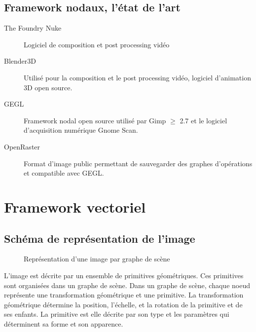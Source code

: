 		\subsection{Framework nodaux, l'état de l'art}
			\begin{description}
				\item[The Foundry Nuke]Logiciel de composition et post processing vidéo
				\item[Blender3D]Utilisé pour la composition et le post processing vidéo, logiciel d'animation 3D open source.
				\item[GEGL]Framework nodal open source utilisé par Gimp $\geq$ 2.7 et le logiciel d'acquisition numérique Gnome Scan.
				\item[OpenRaster]Format d'image public permettant de sauvegarder des graphes d'opérations et compatible avec GEGL.
			\end{description}

	\section{Framework vectoriel}
		\subsection{Schéma de représentation de l'image}
			\begin{figure}[h]
				\centering
				\caption{Représentation d'une image par graphe de scène}
				\label{fig:scenegraph}
			\end{figure}
			L'image est décrite par un ensemble de primitives géométriques. Ces primitives sont organisées dans un graphe de scène. Dans un 
			graphe de scène, chaque noeud représente une transformation géométrique et une primitive. La transformation géométrique détermine
			la position, l'échelle, et la rotation de la primitive et de ses enfants. La primitive est elle décrite par son type et les paramètres
			qui déterminent sa forme et son apparence.

